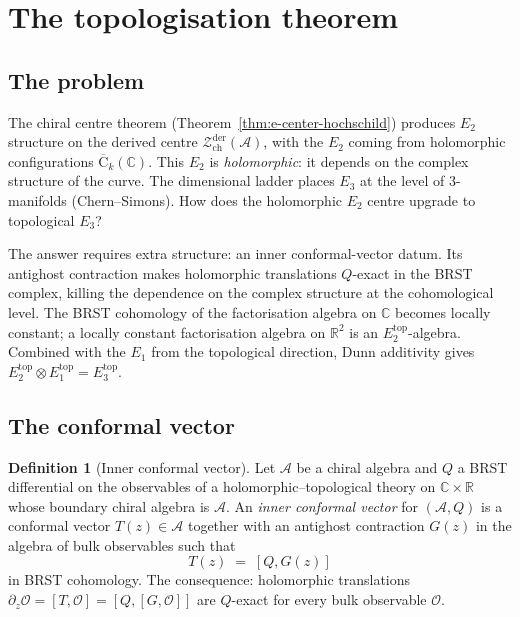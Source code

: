 \documentclass[11pt,reqno]{amsart}
\theoremstyle{definition}
\newtheorem{definition}[theorem]{Definition}
\theoremstyle{remark}
\providecommand{\cA}{\mathcal{A}}
\providecommand{\cO}{\mathcal{O}}
\providecommand{\cZ}{\mathcal{Z}}
\providecommand{\FM}{\overline{\mathrm{C}}}
\providecommand{\Eone}{E_1}
\providecommand{\Etwo}{E_2}
\providecommand{\Ethree}{E_3}
\providecommand{\bC}{\mathbb{C}}
\providecommand{\bR}{\mathbb{R}}
\begin{document}

\section{The topologisation theorem}
\label{sec:topologisation}

\subsection{The problem}

The chiral centre theorem
(Theorem~\ref{thm:e-center-hochschild}) produces $\Etwo$
structure on the derived centre
$\cZ^{\mathrm{der}}_{\mathrm{ch}}(\cA)$, with the $\Etwo$
coming from holomorphic configurations $\FM_k(\bC)$. This
$\Etwo$ is \emph{holomorphic}: it depends on the complex
structure of the curve. The dimensional ladder places $\Ethree$
at the level of $3$-manifolds (Chern--Simons). How does the
holomorphic $\Etwo$ centre upgrade to topological $\Ethree$?

The answer requires extra structure: an inner conformal-vector datum.
Its antighost contraction makes holomorphic translations $Q$-exact
in the BRST complex, killing the dependence on the complex
structure at the cohomological level. The BRST cohomology of
the factorisation algebra on $\bC$ becomes locally constant;
a locally constant factorisation algebra on $\bR^2$ is an
$\Etwo^{\mathrm{top}}$-algebra. Combined with the $\Eone$ from
the topological direction, Dunn additivity gives
$\Etwo^{\mathrm{top}} \otimes \Eone^{\mathrm{top}} =
\Ethree^{\mathrm{top}}$.

\subsection{The conformal vector}

\begin{definition}[Inner conformal vector]
\label{def:e-conformal-vector}
Let $\cA$ be a chiral algebra and $Q$ a BRST differential on the
observables of a holomorphic--topological theory on
$\bC \times \bR$ whose boundary chiral algebra is $\cA$. An
\emph{inner conformal vector} for $(\cA, Q)$ is a conformal
vector $T(z) \in \cA$ together with an antighost contraction
$G(z)$ in the algebra of bulk observables such
that
\begin{equation}\label{eq:e-sugawara-exact}
T(z) \;=\; [Q, G(z)]
\end{equation}
in BRST cohomology. The consequence: holomorphic translations
$\partial_z \cO = [T, \cO] = [Q, [G, \cO]]$ are $Q$-exact for
every bulk observable $\cO$.
\end{definition}
\end{document}
